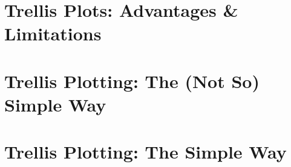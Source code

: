\section{Trellis Plots: Advantages \& Limitations}
\label{sec:trellis}


\section{Trellis Plotting: The (Not So) Simple Way}
\label{sec:basic_trellis}


\section{Trellis Plotting: The Simple Way}
\label{sec:rupture_trellis}



